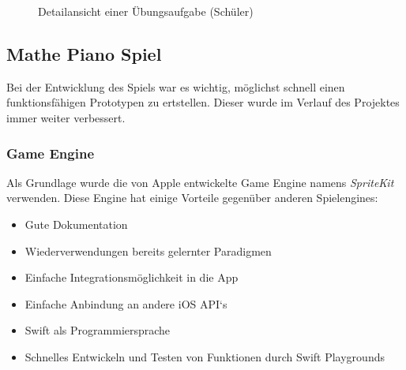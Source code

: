 \begin{figure}[H]
	\centering
	\caption{Detailansicht einer Übungsaufgabe (Schüler)}
	\label{Detailansicht einer Uebungsaufgabe}
\end{figure}

\subsection{Mathe Piano Spiel}
Bei der Entwicklung des Spiels war es wichtig, möglichst schnell einen funktionsfähigen Prototypen zu ertstellen. Dieser wurde im Verlauf des Projektes immer weiter verbessert.


\subsubsection{Game Engine}
Als Grundlage wurde die von Apple entwickelte Game Engine namens \textit{SpriteKit} verwenden. Diese Engine hat einige Vorteile gegenüber anderen Spielengines:
\begin{itemize}
\item Gute Dokumentation
\item Wiederverwendungen bereits gelernter Paradigmen    
\item Einfache Integrationsmöglichkeit in die App
\item Einfache Anbindung an andere iOS API‘s
\item Swift als Programmiersprache 
\item Schnelles Entwickeln und Testen von Funktionen durch Swift Playgrounds
\end{itemize}

